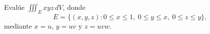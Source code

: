 Evalúe $\iiint_E xyz\,dV$, donde
\[
E=\{(x,y,z):0\leq x\leq1,\ 0\leq y\leq x,\ 0\leq z\leq y\},
\]
mediante $x=u$, $y=uv$ y $z=uvw$.
